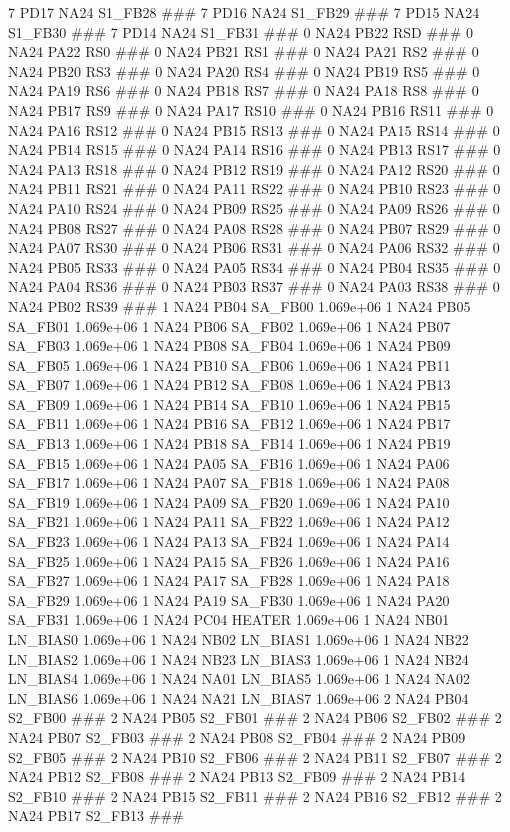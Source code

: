 7 PD17 NA24 S1_FB28 ### 
7 PD16 NA24 S1_FB29 ### 
7 PD15 NA24 S1_FB30 ### 
7 PD14 NA24 S1_FB31 ### 
0 NA24 PB22 RSD ### 
0 NA24 PA22 RS0 ### 
0 NA24 PB21 RS1 ### 
0 NA24 PA21 RS2 ### 
0 NA24 PB20 RS3 ### 
0 NA24 PA20 RS4 ### 
0 NA24 PB19 RS5 ### 
0 NA24 PA19 RS6 ### 
0 NA24 PB18 RS7 ### 
0 NA24 PA18 RS8 ### 
0 NA24 PB17 RS9 ### 
0 NA24 PA17 RS10 ### 
0 NA24 PB16 RS11 ### 
0 NA24 PA16 RS12 ### 
0 NA24 PB15 RS13 ### 
0 NA24 PA15 RS14 ### 
0 NA24 PB14 RS15 ### 
0 NA24 PA14 RS16 ### 
0 NA24 PB13 RS17 ### 
0 NA24 PA13 RS18 ### 
0 NA24 PB12 RS19 ### 
0 NA24 PA12 RS20 ### 
0 NA24 PB11 RS21 ### 
0 NA24 PA11 RS22 ### 
0 NA24 PB10 RS23 ### 
0 NA24 PA10 RS24 ### 
0 NA24 PB09 RS25 ### 
0 NA24 PA09 RS26 ### 
0 NA24 PB08 RS27 ### 
0 NA24 PA08 RS28 ### 
0 NA24 PB07 RS29 ### 
0 NA24 PA07 RS30 ### 
0 NA24 PB06 RS31 ### 
0 NA24 PA06 RS32 ### 
0 NA24 PB05 RS33 ### 
0 NA24 PA05 RS34 ### 
0 NA24 PB04 RS35 ### 
0 NA24 PA04 RS36 ### 
0 NA24 PB03 RS37 ### 
0 NA24 PA03 RS38 ### 
0 NA24 PB02 RS39 ### 
1 NA24 PB04 SA_FB00 1.069e+06 
1 NA24 PB05 SA_FB01 1.069e+06 
1 NA24 PB06 SA_FB02 1.069e+06 
1 NA24 PB07 SA_FB03 1.069e+06 
1 NA24 PB08 SA_FB04 1.069e+06 
1 NA24 PB09 SA_FB05 1.069e+06 
1 NA24 PB10 SA_FB06 1.069e+06 
1 NA24 PB11 SA_FB07 1.069e+06 
1 NA24 PB12 SA_FB08 1.069e+06 
1 NA24 PB13 SA_FB09 1.069e+06 
1 NA24 PB14 SA_FB10 1.069e+06 
1 NA24 PB15 SA_FB11 1.069e+06 
1 NA24 PB16 SA_FB12 1.069e+06 
1 NA24 PB17 SA_FB13 1.069e+06 
1 NA24 PB18 SA_FB14 1.069e+06 
1 NA24 PB19 SA_FB15 1.069e+06 
1 NA24 PA05 SA_FB16 1.069e+06 
1 NA24 PA06 SA_FB17 1.069e+06 
1 NA24 PA07 SA_FB18 1.069e+06 
1 NA24 PA08 SA_FB19 1.069e+06 
1 NA24 PA09 SA_FB20 1.069e+06 
1 NA24 PA10 SA_FB21 1.069e+06 
1 NA24 PA11 SA_FB22 1.069e+06 
1 NA24 PA12 SA_FB23 1.069e+06 
1 NA24 PA13 SA_FB24 1.069e+06 
1 NA24 PA14 SA_FB25 1.069e+06 
1 NA24 PA15 SA_FB26 1.069e+06 
1 NA24 PA16 SA_FB27 1.069e+06 
1 NA24 PA17 SA_FB28 1.069e+06 
1 NA24 PA18 SA_FB29 1.069e+06 
1 NA24 PA19 SA_FB30 1.069e+06 
1 NA24 PA20 SA_FB31 1.069e+06 
1 NA24 PC04 HEATER 1.069e+06 
1 NA24 NB01 LN_BIAS0 1.069e+06 
1 NA24 NB02 LN_BIAS1 1.069e+06 
1 NA24 NB22 LN_BIAS2 1.069e+06 
1 NA24 NB23 LN_BIAS3 1.069e+06 
1 NA24 NB24 LN_BIAS4 1.069e+06 
1 NA24 NA01 LN_BIAS5 1.069e+06 
1 NA24 NA02 LN_BIAS6 1.069e+06 
1 NA24 NA21 LN_BIAS7 1.069e+06 
2 NA24 PB04 S2_FB00 ### 
2 NA24 PB05 S2_FB01 ### 
2 NA24 PB06 S2_FB02 ### 
2 NA24 PB07 S2_FB03 ### 
2 NA24 PB08 S2_FB04 ### 
2 NA24 PB09 S2_FB05 ### 
2 NA24 PB10 S2_FB06 ### 
2 NA24 PB11 S2_FB07 ### 
2 NA24 PB12 S2_FB08 ### 
2 NA24 PB13 S2_FB09 ### 
2 NA24 PB14 S2_FB10 ### 
2 NA24 PB15 S2_FB11 ### 
2 NA24 PB16 S2_FB12 ### 
2 NA24 PB17 S2_FB13 ### 
